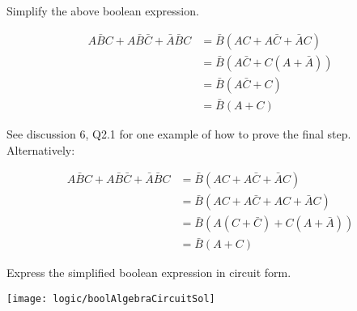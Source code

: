 \begin{blocksection}

\question

Simplify the above boolean expression.
\begin{solution}[0.5in]

\begin{equation}
\begin{split}
A\bar{B}C + A\bar{B}\bar{C} + \bar{A}\bar{B}C &= \bar{B}(AC + A\bar{C} + \bar{A}C) \\
&= \bar{B}(A\bar{C} + C(A + \bar{A})) \\
&= \bar{B}(A\bar{C} + C) \\
&= \bar{B}(A + C)
\end{split}
\end{equation}

See discussion 6, Q2.1 for one example of how to prove the final step. Alternatively:

\begin{equation}
\begin{split}
A\bar{B}C + A\bar{B}\bar{C} + \bar{A}\bar{B}C &= \bar{B}(AC + A\bar{C} + \bar{A}C) \\
&= \bar{B}(AC + A\bar{C} + AC + \bar{A}C) \\
&= \bar{B}(A(C + \bar{C}) + C(A + \bar{A})) \\
&= \bar{B}(A + C)
\end{split}
\end{equation}

\end{solution}

\end{blocksection}
\begin{blocksection}

\question

Express the simplified boolean expression in circuit form.

\begin{solution}[0.5in]

\texttt{[image: logic/boolAlgebraCircuitSol]}

\end{solution}


\end{blocksection}